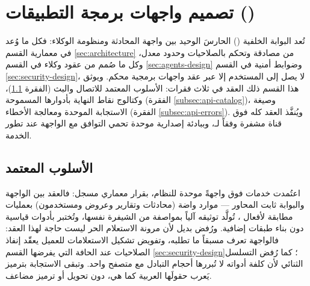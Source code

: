 \section{تصميم واجهات برمجة التطبيقات ()}
\label{sec:api-design}

تُعد البوابة الخلفية () الحارسَ الوحيد بين واجهة المحادثة ومنظومة الوكلاء: فكل ما وُعد في معمارية القسم \ref{sec:architecture} من مصادقة وتحكم بالصلاحيات وحدود معدل، وكل ما صُمم من عقود وكلاء في القسم \ref{sec:agents-design} وضوابط أمنية في القسم \ref{sec:security-design}، لا يصل إلى المستخدم إلا عبر عقد واجهات برمجية محكم. ويوثق هذا القسم ذلك العقد في ثلاث فقرات: الأسلوب المعتمد للاتصال والبث (الفقرة \ref{subsec:api-style})، وكتالوج نقاط النهاية بأدوارها المسموحة (الفقرة \ref{subsec:api-catalog})، وصيغة الاستجابة الموحدة ومعالجة الأخطاء (الفقرة \ref{subsec:api-errors}). ويُنفَّذ العقد كله فوق قناة مشفرة  وفقاً لـ، وببادئة إصدارية موحدة  تحمي التوافق مع الواجهة عند تطور الخدمة.

\subsection{الأسلوب المعتمد}
\label{subsec:api-style}

اعتُمدت خدمات  فوق  واجهةً موحدة للنظام، بقرار معماري مسجل: فالعقد بين الواجهة والبوابة ثابت المحاور — موارد واضة (محادثات وتقارير وعروض ومستخدمون) بعمليات مطابقة لأفعال ، تُولَّد توثيقه آلياً بمواصفة  من الشيفرة نفسها، وتُختبر بأدوات قياسية دون بناء طبقات إضافية. ورُفض بديل  لأن مرونة الاستعلام الحر ليست حاجة لهذا العقد: فالواجهة تعرف مسبقاً ما تطلبه، وتفويض تشكيل الاستعلامات للعميل يعقّد إنفاذ الصلاحيات عند الحافة التي يفرضها القسم \ref{sec:security-design}؛ كما رُفض التسلسل الثنائي  لأن كلفة أدواته لا تُبررها أحجام التبادل مع متصفح واحد. وتبقى الاستجابة بترميز  يَعرب حقولَها العربية كما هي، دون تحويل أو ترميز مضاعف.

